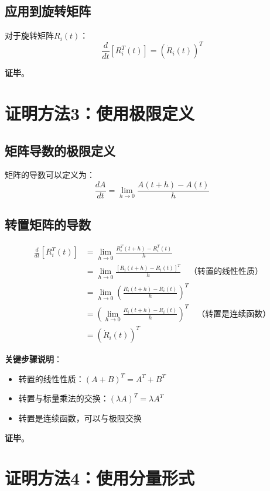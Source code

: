\documentclass[12pt,a4paper]{article}
\begin{document}
\subsection{应用到旋转矩阵}

对于旋转矩阵$R_i(t)$：
\begin{equation}
\frac{d}{dt}[R_i^T(t)] = (\dot{R}_i(t))^T
\end{equation}

\textbf{证毕}。

\section{证明方法3：使用极限定义}

\subsection{矩阵导数的极限定义}

矩阵的导数可以定义为：
\begin{equation}
\frac{dA}{dt} = \lim_{h \to 0} \frac{A(t+h) - A(t)}{h}
\end{equation}

\subsection{转置矩阵的导数}

\begin{align}
\frac{d}{dt}[R_i^T(t)] &= \lim_{h \to 0} \frac{R_i^T(t+h) - R_i^T(t)}{h} \\
&= \lim_{h \to 0} \frac{[R_i(t+h) - R_i(t)]^T}{h} \quad \text{（转置的线性性质）} \\
&= \lim_{h \to 0} \left(\frac{R_i(t+h) - R_i(t)}{h}\right)^T \\
&= \left(\lim_{h \to 0} \frac{R_i(t+h) - R_i(t)}{h}\right)^T \quad \text{（转置是连续函数）} \\
&= (\dot{R}_i(t))^T
\end{align}

\textbf{关键步骤说明}：
\begin{itemize}
\item 转置的线性性质：$(A + B)^T = A^T + B^T$
\item 转置与标量乘法的交换：$(\lambda A)^T = \lambda A^T$
\item 转置是连续函数，可以与极限交换
\end{itemize}

\textbf{证毕}。

\section{证明方法4：使用分量形式}
\end{document}
